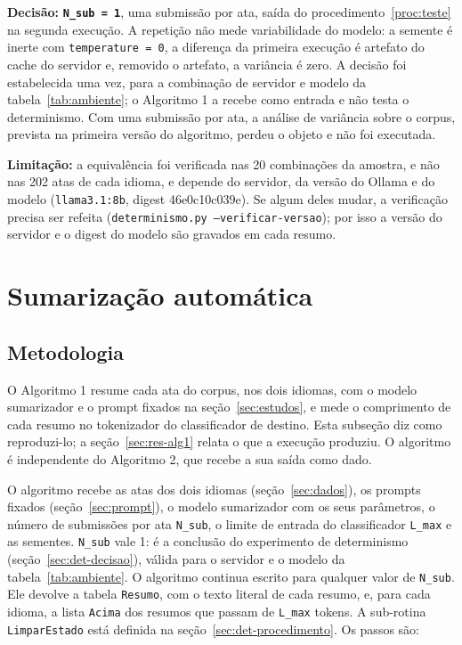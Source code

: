\documentclass[12pt]{article}
\begin{document}
\textbf{Decisão:} \textbf{\texttt{N\_sub = 1}}, uma submissão por ata, saída do
procedimento~\ref{proc:teste} na segunda execução. A repetição não mede
variabilidade do modelo: a semente é inerte com \texttt{temperature = 0}, a
diferença da primeira execução é artefato do cache do servidor e, removido o
artefato, a variância é zero. A decisão foi estabelecida uma vez, para a
combinação de servidor e modelo da tabela~\ref{tab:ambiente}; o Algoritmo 1 a
recebe como entrada e não testa o determinismo. Com uma submissão por ata, a
análise de variância sobre o corpus, prevista na primeira versão do algoritmo,
perdeu o objeto e não foi executada.

\textbf{Limitação:} a equivalência foi verificada nas 20 combinações da amostra,
e não nas 202 atas de cada idioma, e depende do servidor, da versão do Ollama e
do modelo (\texttt{llama3.1:8b}, digest 46e0c10c039e). Se algum deles mudar, a
verificação precisa ser refeita (\texttt{determinismo.py --verificar-versao});
por isso a versão do servidor e o digest do modelo são gravados em cada resumo.

\section{Sumarização automática}\label{sec:sumarizacao}

\subsection{Metodologia}\label{sec:alg1}

O Algoritmo 1 resume cada ata do corpus, nos dois idiomas, com o modelo
sumarizador e o prompt fixados na seção~\ref{sec:estudos}, e mede o
comprimento de cada resumo no tokenizador do classificador de destino. Esta
subseção diz como reproduzi-lo; a seção~\ref{sec:res-alg1} relata o que a execução
produziu. O algoritmo é independente do Algoritmo 2, que recebe a sua saída como
dado.

O algoritmo recebe as atas dos dois idiomas (seção~\ref{sec:dados}), os prompts
fixados (seção~\ref{sec:prompt}), o modelo sumarizador com os seus
parâmetros, o número de submissões por ata \texttt{N\_sub}, o limite de entrada
do classificador \texttt{L\_max} e as sementes. \texttt{N\_sub} vale 1: é a
conclusão do experimento de determinismo (seção~\ref{sec:det-decisao}), válida
para o servidor e o modelo da tabela~\ref{tab:ambiente}. O algoritmo continua
escrito para qualquer valor de \texttt{N\_sub}. Ele devolve a tabela
\texttt{Resumo}, com o texto literal de cada resumo, e, para cada idioma, a
lista \texttt{Acima} dos resumos que passam de \texttt{L\_max} tokens. A sub-rotina
\texttt{LimparEstado} está definida na seção~\ref{sec:det-procedimento}. Os passos são:
\end{document}

